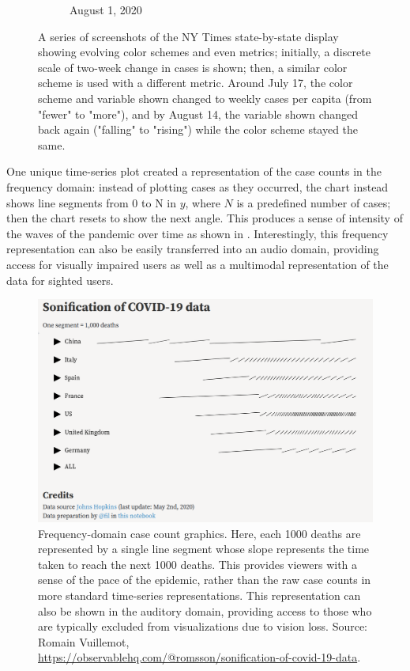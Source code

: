 \documentclass[article]{jdssv}\usepackage[]{graphicx}\usepackage[]{xcolor}
\begin{document}
\begin{figure}
\begin{subfigure}[t]{.25\textwidth}
\caption{August 1, 2020}\label{fig:nyt-colors4}
\end{subfigure}\hfill
\caption{A series of screenshots of the NY Times state-by-state display showing evolving color schemes and even metrics; initially, a discrete scale of two-week change in cases is shown; then, a similar color scheme is used with a different metric. Around July 17, the color scheme and variable shown changed to weekly cases per capita (from "fewer" to "more"), and by August 14, the variable shown changed back again ("falling" to "rising") while the color scheme stayed the same.}\label{fig:sparklines-heatmap-nyt}
\end{figure}

One unique time-series plot created a representation of the case counts in the frequency domain: instead of plotting cases as they occurred, the chart instead shows line segments from 0 to N in $y$, where $N$ is a predefined number of cases; then the chart resets to show the next angle. This produces a sense of intensity of the waves of the pandemic over time as shown in . Interestingly, this frequency representation can also be easily transferred into an audio domain, providing access for visually impaired users as well as a multimodal representation of the data for sighted users. 

\begin{figure}
\centering
\includegraphics[width=.75\linewidth]{frequency-domain}
\caption{Frequency-domain case count graphics. Here, each 1000 deaths are represented by a single line segment whose slope represents the time taken to reach the next 1000 deaths. This provides viewers with a sense of the pace of the epidemic, rather than the raw case counts in more standard time-series representations. This representation can also be shown in the auditory domain, providing access to those who are typically excluded from visualizations due to vision loss. Source: Romain Vuillemot, \url{https://observablehq.com/@romsson/sonification-of-covid-19-data}.}
\label{fig:freq-domain}
\end{figure}
\end{document}
